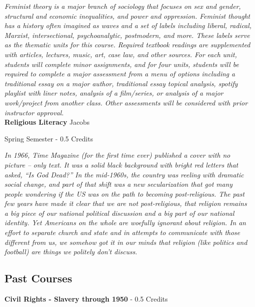 \vspace{1mm}\emph{Feminist theory is a major branch of sociology that focuses on sex and gender, structural and economic inequalities, and power and oppression.  Feminist thought has a history often imagined as waves and a set of labels including liberal, radical, Marxist, intersectional, psychoanalytic, postmodern, and more.  These labels serve as the thematic units for this course.  Required textbook readings are supplemented with articles, lectures, music, art, case law, and other sources.  For each unit, students will complete minor assignments, and for four units, students will be required to complete a major assessment from a menu of options including a traditional essay on a major author, traditional essay topical analysis, spotify playlist with liner notes, analysis of a film/series, or analysis of a major work/project from another class.  Other assessments will be considered with prior instructor approval.}\\

\noindent\textbf{Religious Literacy} \hfill Jacobs

\noindent Spring Semester - 0.5 Credits

\vspace{1mm}\emph{In 1966, Time Magazine (for the first time ever) published a cover with no picture – only text. It was a solid black background with bright red letters that asked, “Is God Dead?” In the mid-1960s, the country was reeling with dramatic social change, and part of that shift was a new secularization that got many people wondering if the US was on the path to becoming post-religious. The past few years have made it clear that we are not post-religious, that religion remains a big piece of our national political discussion and a big part of our national identity. Yet Americans on the whole are woefully ignorant about religion. In an effort to separate church and state and in attempts to communicate with those different from us, we somehow got it in our minds that religion (like politics and football) are things we politely don’t discuss.}\\



\subsection{Past Courses}


\noindent\noindent\textbf{  Civil Rights - Slavery through 1950   }  - 0.5 Credits


